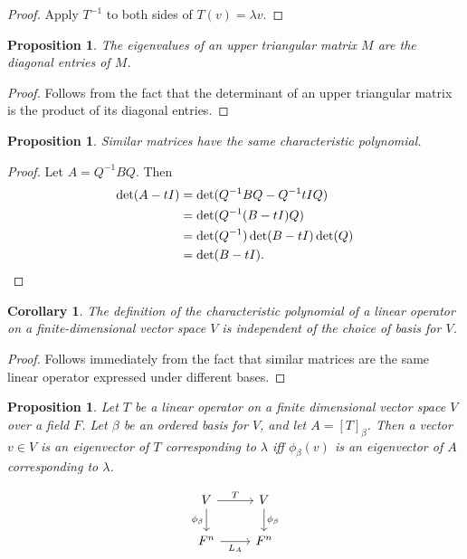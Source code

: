 \documentclass[12pt]{article}
\theoremstyle{plain}
\newtheorem{corollary}[theorem]{Corollary}
\newtheorem{proposition}[theorem]{Proposition}
\theoremstyle{definition}
\theoremstyle{remark}
\begin{document}
\begin{proof}
Apply $T^{-1}$ to both sides of $T(v) = \lambda v$.
\end{proof}

\begin{proposition}
The eigenvalues of an upper triangular matrix $M$ are the diagonal entries of $M$.
\end{proposition}

\begin{proof}
Follows from the fact that the determinant of an upper triangular matrix is the product of its diagonal entries.
\end{proof}

\begin{proposition}
Similar matrices have the same characteristic polynomial.
\end{proposition}

\begin{proof}
Let $A = Q^{-1} B Q$. Then
\begin{align*}
\det(A - tI) &= \det(Q^{-1} B Q - Q^{-1} tI Q) \\
&= \det(Q^{-1}(B - tI)Q) \\
&= \det(Q^{-1})\det(B - tI)\det(Q) \\
&= \det(B - tI).\qedhere
\end{align*}
\end{proof}

\begin{corollary}
The definition of the characteristic polynomial of a linear operator on a finite-dimensional vector space $V$ is independent of the choice of basis for $V$.
\end{corollary}

\begin{proof}
Follows immediately from the fact that similar matrices are the same linear operator expressed under different bases.
\end{proof}

\begin{proposition}
Let $T$ be a linear operator on a finite dimensional vector space $V$ over a field $F$. Let $\beta$ be an ordered basis for $V$, and let $A = [T]_\beta$. Then a vector $v \in V$ is an eigenvector of $T$ corresponding to $\lambda$ iff $\phi_\beta(v)$ is an eigenvector of $A$ corresponding to $\lambda$.
\end{proposition}

\begin{figure}[H]
$$\begin{tikzcd}
V \arrow{r}{T} \arrow[swap]{d}{\phi_\beta} & V \arrow{d}{\phi_\beta} \\
F^n \arrow[swap]{r}{L_A} & F^n
\end{tikzcd}$$
\end{figure}
\end{document}
